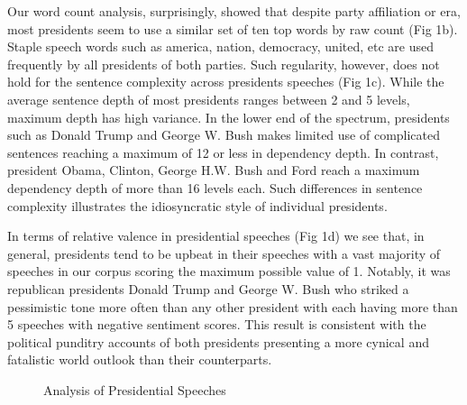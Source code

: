 \documentclass{article}
\begin{document}
{{{Our word count analysis, surprisingly, showed that despite party affiliation or era, most presidents seem to use a similar set of ten top words by raw count (Fig 1b). Staple speech words such as america, nation, democracy, united, etc are used frequently by all presidents of both parties. Such regularity, however, does not hold for the sentence complexity across presidents speeches (Fig 1c).  While the average sentence depth of most presidents ranges between 2 and 5 levels, maximum depth has high variance. In the lower end of the spectrum, presidents such as Donald Trump and George W. Bush makes limited use of complicated sentences reaching a maximum of 12 or less in dependency depth. In contrast, president Obama, Clinton, George H.W. Bush and Ford reach a maximum dependency depth of more than 16 levels each. Such differences in sentence complexity illustrates the idiosyncratic style of individual presidents.

In terms of relative valence in presidential speeches (Fig 1d) we see that, in general, presidents tend to be upbeat in their speeches with a vast majority of speeches in our corpus scoring the maximum possible value of 1. Notably, it was republican presidents Donald Trump and George W. Bush who striked a pessimistic tone more often than any other president with each having more than 5 speeches with negative sentiment scores. This result is consistent with the political punditry accounts of both presidents presenting a more cynical and fatalistic world outlook than their counterparts.
\begin{figure}[!htb]
	\caption{\label{fig:my-label1} Analysis of Presidential Speeches}
\end{figure}
}
}}
\end{document}
